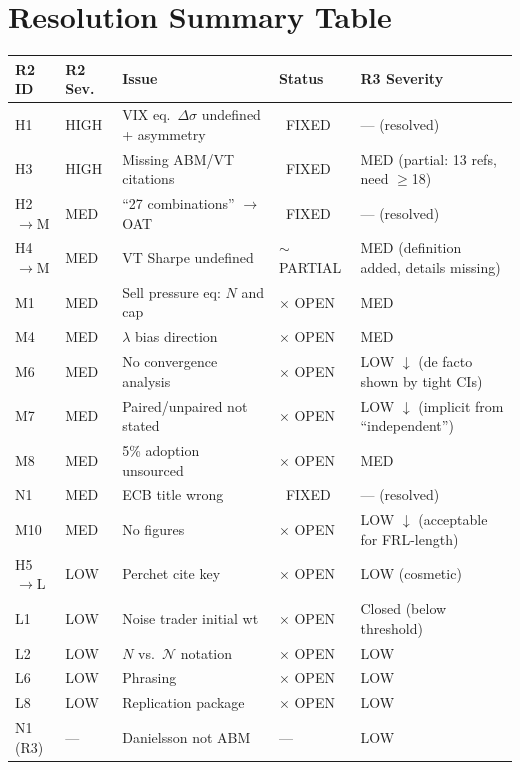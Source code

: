 \documentclass[12pt,a4paper]{article}
\newcommand{\FIXED}{\textcolor{okgreen}{\checkmark\ FIXED}}
\newcommand{\PARTIAL}{\textcolor{warncolor}{$\sim$ PARTIAL}}
\newcommand{\OPEN}{\textcolor{errorred}{$\times$ OPEN}}
\begin{document}
\section*{Resolution Summary Table}

{
\footnotesize
\begin{longtable}{@{}p{1.2cm}p{1.2cm}p{4.5cm}p{1.5cm}p{3.5cm}@{}}
\toprule
\textbf{R2 ID} & \textbf{R2 Sev.} & \textbf{Issue} & \textbf{Status} & \textbf{R3 Severity} \\
\midrule
\endhead
H1 & HIGH & VIX eq.\ $\Delta\sigma$ undefined + asymmetry & \FIXED & --- (resolved) \\
H3 & HIGH & Missing ABM/VT citations & \FIXED & \textcolor{warncolor}{MED} (partial: 13 refs, need $\geq$18) \\
\midrule
H2$\to$M & MED & ``27 combinations'' $\to$ OAT & \FIXED & --- (resolved) \\
H4$\to$M & MED & VT Sharpe undefined & \PARTIAL & \textcolor{warncolor}{MED} (definition added, details missing) \\
M1 & MED & Sell pressure eq: $N$ and cap & \OPEN & \textcolor{warncolor}{MED} \\
M4 & MED & $\lambda$ bias direction & \OPEN & \textcolor{warncolor}{MED} \\
M6 & MED & No convergence analysis & \OPEN & \textcolor{okgreen}{LOW} $\downarrow$ (de facto shown by tight CIs) \\
M7 & MED & Paired/unpaired not stated & \OPEN & \textcolor{okgreen}{LOW} $\downarrow$ (implicit from ``independent'') \\
M8 & MED & 5\% adoption unsourced & \OPEN & \textcolor{warncolor}{MED} \\
N1 & MED & ECB title wrong & \FIXED & --- (resolved) \\
M10 & MED & No figures & \OPEN & \textcolor{okgreen}{LOW} $\downarrow$ (acceptable for FRL-length) \\
\midrule
H5$\to$L & LOW & Perchet cite key & \OPEN & \textcolor{okgreen}{LOW} (cosmetic) \\
L1 & LOW & Noise trader initial wt & \OPEN & Closed (below threshold) \\
L2 & LOW & $N$ vs.\ $\mathcal{N}$ notation & \OPEN & \textcolor{okgreen}{LOW} \\
L6 & LOW & Phrasing & \OPEN & \textcolor{okgreen}{LOW} \\
L8 & LOW & Replication package & \OPEN & \textcolor{okgreen}{LOW} \\
\midrule
N1 (R3) & --- & Danielsson not ABM & --- & \textcolor{okgreen}{LOW} \\
\bottomrule
\end{longtable}
}
\end{document}
